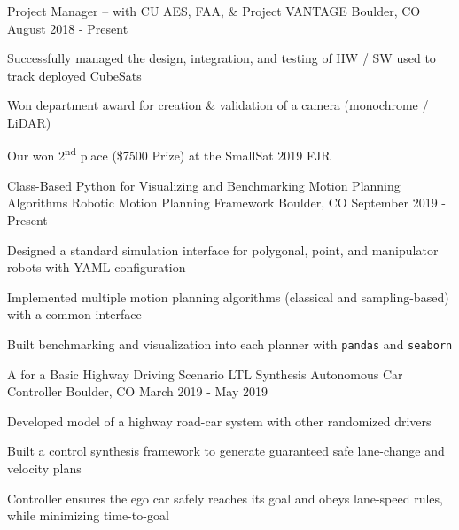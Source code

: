 \begin{cventries}
\cventry
    {Project Manager --  with CU AES, FAA, \& }
    {Project VANTAGE}
    {Boulder, CO}
    {August 2018 - Present}
    {
     \begin{cvitems}
      \item{Successfully managed the design, integration, and testing of HW / SW used to track deployed CubeSats}
      \item{Won department award for creation \& validation of a camera (monochrome / LiDAR) }
      \item{Our
       won 2\textsuperscript{nd} place (\$7500 Prize) at the SmallSat 2019 FJR }
     \end{cvitems}
    }
    
  \cventry
  	{Class-Based Python   for Visualizing and Benchmarking Motion Planning Algorithms }
    {Robotic Motion Planning Framework}
    {Boulder, CO}
    {September 2019 - Present}
    {
      \begin{cvitems}
        \item{Designed a standard simulation interface for polygonal, point, and manipulator robots with YAML configuration}
        \item{Implemented multiple motion planning algorithms (classical and sampling-based) with a common interface}
        \item {Built benchmarking and visualization into each planner with \texttt{pandas} and \texttt{seaborn}}
      \end{cvitems}
    }

  \cventry
  	{A  for a Basic Highway Driving Scenario}
    {LTL Synthesis Autonomous Car Controller}
    {Boulder, CO}
    {March 2019 - May 2019}
    {
      \begin{cvitems}
        \item{Developed model of a highway road-car system with other randomized drivers}
        \item{Built a control synthesis framework to generate guaranteed safe lane-change and velocity plans}
        \item {Controller ensures the ego car safely reaches its goal and obeys lane-speed rules, while minimizing time-to-goal}
      \end{cvitems}
    }
\end{cventries}
